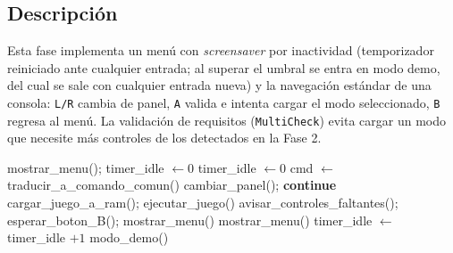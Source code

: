 \documentclass[11pt,a4paper]{article}
\begin{document}
\begin{center}
{}
\end{center}

\subsection{Descripci\'on}
Esta fase implementa un men\'u con \emph{screensaver} por inactividad
(temporizador reiniciado ante cualquier entrada; al superar el umbral se
entra en modo demo, del cual se sale con cualquier entrada nueva) y la
navegaci\'on est\'andar de una consola: \texttt{L/R} cambia de panel,
\texttt{A} valida e intenta cargar el modo seleccionado, \texttt{B} regresa
al men\'u. La validaci\'on de requisitos (\texttt{MultiCheck}) evita cargar
un modo que necesite m\'as controles de los detectados en la Fase 2.

\begin{algorithm}[H]
\caption{Fase 3 --- Navegaci\'on y selecci\'on local}
\begin{algorithmic}[1]
\State mostrar\_menu(); timer\_idle $\gets 0$
\Loop
        \State timer\_idle $\gets 0$
        \State cmd $\gets$ traducir\_a\_comando\_comun()
            \State cambiar\_panel(); \textbf{continue}
                \State cargar\_juego\_a\_ram(); ejecutar\_juego() 
            \Else
                \State avisar\_controles\_faltantes(); esperar\_boton\_B(); mostrar\_menu()
            \EndIf
            \State mostrar\_menu()
        \EndIf
    \Else
        \State timer\_idle $\gets$ timer\_idle $+ 1$
            \State modo\_demo() 
        \EndIf
    \EndIf
\EndLoop
\end{algorithmic}
\end{algorithm}
\end{document}
